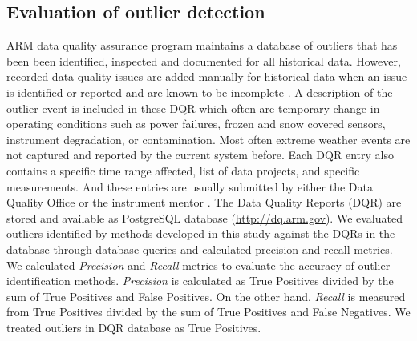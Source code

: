 \subsection{Evaluation of outlier detection}
ARM data quality assurance program maintains a database of outliers that
has been been identified, inspected and documented for all historical
data. 
However, recorded data quality
issues are added manually for historical data when an issue is
identified or reported and are known to be incomplete
\cite{mccord2016arm}. 
A description of the outlier event is included in these DQR which often
are temporary change in operating conditions such as power failures, frozen 
and snow covered sensors, instrument degradation, or contamination. 
Most often extreme weather events are not captured and reported by the
current system before. Each DQR entry also contains a specific time range affected, 
list of data projects, and specific measurements. And these entries 
are usually submitted by either the Data Quality Office \cite{peppler2016arm} 
or the instrument mentor \cite{cress2016deploying}. 
The Data Quality Reports (DQR) are stored and available as PostgreSQL
database (\url{http://dq.arm.gov}). 
We evaluated outliers
identified by methods developed in this study against the DQRs in the
database through database queries and calculated precision and recall
metrics. 
We calculated \textit{Precision} and \textit{Recall} metrics to evaluate 
the accuracy of outlier identification methods.
\textit{Precision} is calculated as True Positives divided by the
sum of True Positives and False Positives. On the other hand,
\textit{Recall} is measured from True Positives divided by the sum
of True Positives and False Negatives. We treated outliers in
DQR database as True Positives.


